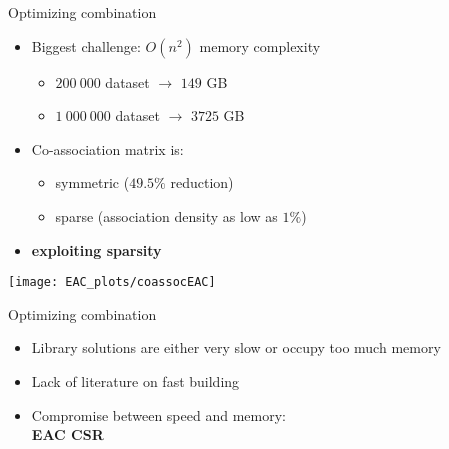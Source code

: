 \begin{frame}{Optimizing combination}

\begin{itemize}

\item Biggest challenge: $O(n^2)$ memory complexity
  \begin{itemize}
  \item $200\:000$ dataset $\longrightarrow$ $149$ GB
  \item $1\:000\:000$ dataset $\longrightarrow$ $3725$ GB
  \end{itemize}

\item Co-association matrix is:
  \begin{itemize}
  \item symmetric ($49.5\%$ reduction)
  \item sparse (association density as low as $1\%$)
  \end{itemize}

\item \textbf{exploiting sparsity}


\end{itemize}

\begin{center}
\texttt{[image: EAC\_plots/coassocEAC]}
\end{center}

\end{frame}



\begin{frame}{Optimizing combination}

\begin{itemize}


\item Library solutions are either very slow or occupy too much memory

\item Lack of literature on fast building

\item Compromise between speed and memory: \\
\centering
\Large{\textbf{EAC CSR}}


\end{itemize}

\end{frame}

